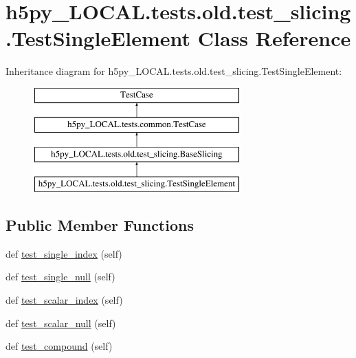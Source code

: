 \hypertarget{classh5py__LOCAL_1_1tests_1_1old_1_1test__slicing_1_1TestSingleElement}{}\section{h5py\+\_\+\+L\+O\+C\+A\+L.\+tests.\+old.\+test\+\_\+slicing.\+Test\+Single\+Element Class Reference}
\label{classh5py__LOCAL_1_1tests_1_1old_1_1test__slicing_1_1TestSingleElement}
Inheritance diagram for h5py\+\_\+\+L\+O\+C\+A\+L.\+tests.\+old.\+test\+\_\+slicing.\+Test\+Single\+Element\+:\begin{figure}[H]
\begin{center}
\leavevmode
\includegraphics[height=4.000000cm]{classh5py__LOCAL_1_1tests_1_1old_1_1test__slicing_1_1TestSingleElement}
\end{center}
\end{figure}
\subsection*{Public Member Functions}
\begin{DoxyCompactItemize}
\item 
def \hyperlink{classh5py__LOCAL_1_1tests_1_1old_1_1test__slicing_1_1TestSingleElement_a5d935228a7237dcf93fc8ba029f8da55}{test\+\_\+single\+\_\+index} (self)
\item 
def \hyperlink{classh5py__LOCAL_1_1tests_1_1old_1_1test__slicing_1_1TestSingleElement_a82b1d8a654e8b79651909d21c7648fa3}{test\+\_\+single\+\_\+null} (self)
\item 
def \hyperlink{classh5py__LOCAL_1_1tests_1_1old_1_1test__slicing_1_1TestSingleElement_aef4cbec6363f7a9fc82482d7f2dc8a4b}{test\+\_\+scalar\+\_\+index} (self)
\item 
def \hyperlink{classh5py__LOCAL_1_1tests_1_1old_1_1test__slicing_1_1TestSingleElement_a9bc1bc936bbdb93c3465a158ba956fda}{test\+\_\+scalar\+\_\+null} (self)
\item 
def \hyperlink{classh5py__LOCAL_1_1tests_1_1old_1_1test__slicing_1_1TestSingleElement_a3e15519bad3f7c64427c477cb3ca0b13}{test\+\_\+compound} (self)
\end{DoxyCompactItemize}
